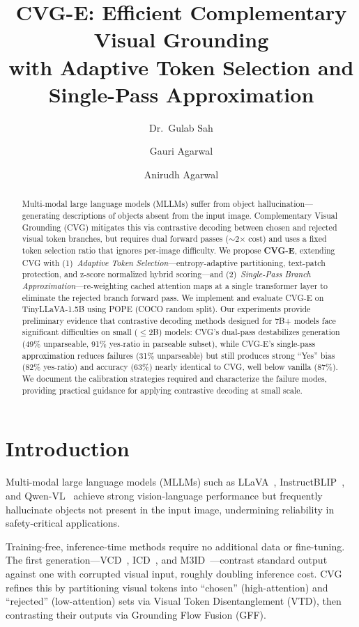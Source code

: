 \documentclass[10pt,twocolumn]{article}
\title{CVG-E: Efficient Complementary Visual Grounding\\with Adaptive Token Selection and Single-Pass Approximation}
\author{Dr.\ Gulab Sah \and Gauri Agarwal \and Anirudh Agarwal}
\date{}
\begin{document}
\maketitle

\begin{abstract}
Multi-modal large language models (MLLMs) suffer from object hallucination---generating descriptions of objects absent from the input image. Complementary Visual Grounding (CVG) mitigates this via contrastive decoding between chosen and rejected visual token branches, but requires dual forward passes ($\sim$2$\times$ cost) and uses a fixed token selection ratio that ignores per-image difficulty. We propose \textbf{CVG-E}, extending CVG with (1)~\emph{Adaptive Token Selection}---entropy-adaptive partitioning, text-patch protection, and z-score normalized hybrid scoring---and (2)~\emph{Single-Pass Branch Approximation}---re-weighting cached attention maps at a single transformer layer to eliminate the rejected branch forward pass. We implement and evaluate CVG-E on TinyLLaVA-1.5B using POPE (COCO random split). Our experiments provide preliminary evidence that contrastive decoding methods designed for 7B+ models face significant difficulties on small ($\leq$2B) models: CVG's dual-pass destabilizes generation (49\% unparseable, 91\% yes-ratio in parseable subset), while CVG-E's single-pass approximation reduces failures (31\% unparseable) but still produces strong ``Yes'' bias (82\% yes-ratio) and accuracy (63\%) nearly identical to CVG, well below vanilla (87\%). We document the calibration strategies required and characterize the failure modes, providing practical guidance for applying contrastive decoding at small scale.
\end{abstract}

\section{Introduction}

Multi-modal large language models (MLLMs) such as LLaVA~\cite{liu2023llava}, InstructBLIP~\cite{dai2023instructblip}, and Qwen-VL~\cite{bai2023qwen} achieve strong vision-language performance but frequently hallucinate objects not present in the input image, undermining reliability in safety-critical applications.

Training-free, inference-time methods require no additional data or fine-tuning. The first generation---VCD~\cite{leng2024vcd}, ICD~\cite{icd2024}, and M3ID~\cite{m3id2024}---contrast standard output against one with corrupted visual input, roughly doubling inference cost. CVG~\cite{fu2025cvg} refines this by partitioning visual tokens into ``chosen'' (high-attention) and ``rejected'' (low-attention) sets via Visual Token Disentanglement (VTD), then contrasting their outputs via Grounding Flow Fusion (GFF).
\end{document}
